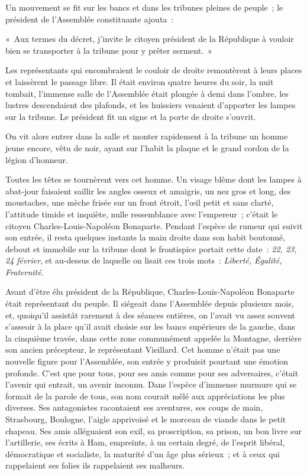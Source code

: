 \documentclass[french,twoside]{book} %
\newenvironment{quoteblock}%
  {\begin{quoting}}
  {\end{quoting}}
\newenvironment{quotebar}{%
    \def\FrameCommand{{\color{rubric!10!}\vrule width 0.5em} \hspace{0.9em}}%
    \def\OuterFrameSep{\itemsep} %
    \MakeFramed {\advance\hsize-\width \FrameRestore}
  }%
  {%
    \endMakeFramed
  }
\renewenvironment{quoteblock}%
  {%
    \savenotes
    \setstretch{0.9}
    \normalfont
    \begin{quotebar}
  }
  {%
    \end{quotebar}
    \spewnotes
  }
\begin{document}
\noindent Un mouvement se fit sur les bancs et dans les tribunes pleines de peuple ; le président de l’Assemblée constituante ajouta :\par

\begin{quoteblock}
 \noindent « Aux termes du décret, j’invite le citoyen président de la République à vouloir bien se transporter à la tribune pour y prêter serment. »
 \end{quoteblock}

\noindent Les représentants qui encombraient le couloir de droite remontèrent à leurs places et laissèrent le passage libre. Il était environ quatre heures du soir, la nuit tombait, l’immense salle de l’Assemblée était plongée à demi dans l’ombre, les lustres descendaient des plafonds, et les huissiers venaient d’apporter les lampes sur la tribune. Le président fit un signe et la porte de droite s’ouvrit.\par
On vit alors entrer dans la salle et monter rapidement à la tribune un homme jeune encore, vêtu de noir, ayant sur l’habit la plaque et le grand cordon de la légion d’honneur.\par
Toutes les têtes se tournèrent vers cet homme. Un visage blême dont les lampes à abat-jour faisaient saillir les angles osseux et amaigris, un nez gros et long, des moustaches, une mèche frisée sur un front étroit, l’œil petit et sans clarté, l’attitude timide et inquiète, nulle ressemblance avec l’empereur ; c’était le citoyen Charles-Louis-Napoléon Bonaparte. Pendant l’espèce de rumeur qui suivit son entrée, il resta quelques instants la main droite dans son habit boutonné, debout et immobile sur la tribune dont le frontispice portait cette date : \emph{22, 23, 24 février}, et au-dessus de laquelle on lisait ces trois mots : \emph{Liberté, Égalité, Fraternité}.\par
Avant d’être élu président de la République, Charles-Louis-Napoléon Bonaparte était représentant du peuple. Il siégeait dans l’Assemblée depuis plusieurs mois, et, quoiqu’il assistât rarement à des séances entières, on l’avait vu assez souvent s’asseoir à la place qu’il avait choisie sur les bancs supérieurs de la gauche, dans la cinquième travée, dans cette zone communément appelée la Montagne, derrière son ancien précepteur, le représentant Vieillard. Cet homme n’était pas une nouvelle figure pour l’Assemblée, son entrée y produisit pourtant une émotion profonde. C’est que pour tous, pour ses amis comme pour ses adversaires, c’était l’avenir qui entrait, un avenir inconnu. Dans l’espèce d’immense murmure qui se formait de la parole de tous, son nom courait mêlé aux appréciations les plus diverses. Ses antagonistes racontaient ses aventures, ses coups de main, Strasbourg, Boulogne, l’aigle apprivoisé et le morceau de viande dans le petit chapeau. Ses amis alléguaient son exil, sa proscription, sa prison, un bon livre sur l’artillerie, ses écrits à Ham, empreints, à un certain degré, de l’esprit libéral, démocratique et socialiste, la maturité d’un âge plus sérieux ; et à ceux qui rappelaient ses folies ils rappelaient ses malheurs.\par
\end{document}
